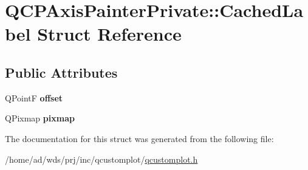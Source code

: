 \hypertarget{struct_q_c_p_axis_painter_private_1_1_cached_label}{}\section{Q\+C\+P\+Axis\+Painter\+Private\+:\+:Cached\+Label Struct Reference}
\label{struct_q_c_p_axis_painter_private_1_1_cached_label}
\subsection*{Public Attributes}
\begin{DoxyCompactItemize}
\item 
Q\+PointF {\bfseries offset}\hypertarget{struct_q_c_p_axis_painter_private_1_1_cached_label_a5f502db71c92e572f1e6f44f62c59d8e}{}\label{struct_q_c_p_axis_painter_private_1_1_cached_label_a5f502db71c92e572f1e6f44f62c59d8e}

\item 
Q\+Pixmap {\bfseries pixmap}\hypertarget{struct_q_c_p_axis_painter_private_1_1_cached_label_a461597cbd470914a9d24b64d16037a88}{}\label{struct_q_c_p_axis_painter_private_1_1_cached_label_a461597cbd470914a9d24b64d16037a88}

\end{DoxyCompactItemize}


The documentation for this struct was generated from the following file\+:\begin{DoxyCompactItemize}
\item 
/home/ad/wds/prj/inc/qcustomplot/\hyperlink{qcustomplot_8h}{qcustomplot.\+h}\end{DoxyCompactItemize}
